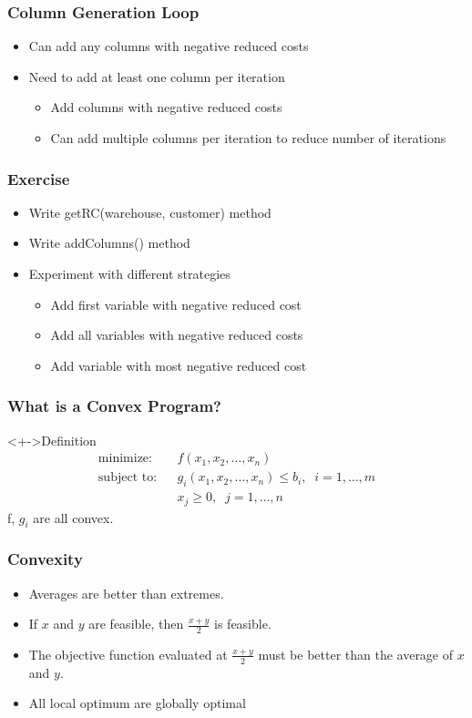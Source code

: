 \documentclass[12pt,handout]{beamer}
\begin{document}
\begin{frame}
  \frametitle{Column Generation Loop}
  \begin{itemize}
  \item Can add any columns with negative reduced costs
  \item Need to add at least one column per iteration
    \begin{itemize}
    \item Add columns with negative reduced costs
    \item Can add multiple columns per iteration to reduce number of iterations
    \end{itemize}
  \end{itemize}
\end{frame}

{
\begin{frame}
  \frametitle{Exercise}
  \begin{itemize}
    \item Write getRC(warehouse, customer) method
    \item Write addColumns() method
    \item Experiment with different strategies
      \begin{itemize}
        \item Add first variable with negative reduced cost
        \item Add all variables with negative reduced costs
        \item Add variable with most negative reduced cost
      \end{itemize}
  \end{itemize}
\end{frame}
}


\begin{frame}
\frametitle{What is a Convex Program?}
\begin{block}<+->{Definition}
\begin{eqnarray}
\mbox{minimize:} && f(x_1, x_2, \ldots, x_n) \nonumber \\
\mbox{subject to:} && g_i(x_1, x_2, \ldots, x_n) \le b_i, \;\; i = 1, \ldots, m \nonumber \\
&& x_j \ge 0,\;\;j = 1, \ldots, n \nonumber
\end{eqnarray}
f, $g_i$ are all convex.
\end{block}
\end{frame}

\begin{frame}
  \frametitle{Convexity}
  \begin{itemize}
    \item Averages are better than extremes.
    \item If $x$ and $y$ are feasible, then $\frac{x + y}{2}$ is feasible.
    \item The objective function evaluated at $\frac{x + y}{2}$ must be better than the average of $x$ and $y$. \\
\item All local optimum are globally optimal
  \end{itemize}
\end{frame}
\end{document}
